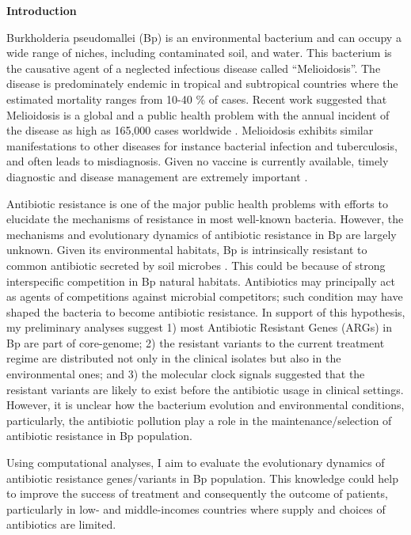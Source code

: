 \documentclass[11pt,twoside]{article}
\date{April 2022}
\begin{document}


\newpage
\linenumbers
\textbf{\Large Introduction}\\

\begin{spacing}{1.5}


Burkholderia pseudomallei (Bp) is an environmental bacterium and can occupy a wide range of niches, including contaminated soil, and water. This bacterium is the causative agent of a neglected infectious disease called “Melioidosis”. The disease is predominately endemic in tropical and subtropical countries where the estimated mortality ranges from 10-40 \% of cases. Recent work suggested that Melioidosis is a global and a public health problem with the annual incident of the disease as high as 165,000 cases worldwide \citep{limmathurotsakul_predicted_2016}. Melioidosis exhibits similar manifestations to other diseases for instance bacterial infection and tuberculosis, and often leads to misdiagnosis. Given no vaccine is currently available, timely diagnostic and disease management are extremely important \citep{wiersinga_melioidosis_2018}.

\vspace{1 mm}

Antibiotic resistance is one of the major public health problems with efforts to elucidate the mechanisms of resistance in most well-known bacteria.  However, the mechanisms and evolutionary dynamics of antibiotic resistance in Bp are largely unknown. Given its environmental habitats, Bp is intrinsically resistant to common antibiotic secreted by soil microbes \citep{schweizer_mechanisms_2012}. This could be because of strong interspecific competition in Bp natural habitats. Antibiotics may principally act as agents of competitions against microbial competitors; such condition may have shaped the bacteria to become antibiotic resistance. In support of this hypothesis, my preliminary analyses suggest 1) most Antibiotic Resistant Genes (ARGs) in Bp are part of core-genome; 2) the resistant variants to the current treatment regime are distributed not only in the clinical isolates but also in the environmental ones; and 3) the molecular clock signals suggested that the resistant variants are likely to exist before the antibiotic usage in clinical settings. However, it is unclear how the bacterium evolution and environmental conditions, particularly, the antibiotic pollution play a role in the maintenance/selection of antibiotic resistance in Bp population. 

\vspace{1 mm}

Using computational analyses, I aim to evaluate the evolutionary dynamics of antibiotic resistance genes/variants in Bp population. This knowledge could help to improve the success of treatment and consequently the outcome of patients, particularly in low- and middle-incomes countries where supply and choices of antibiotics are limited.

\end{spacing}
\end{document}
